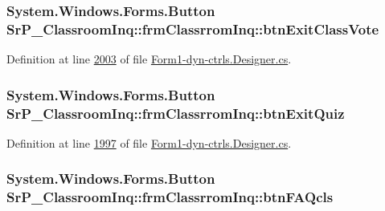 \hypertarget{class_sr_p___classroom_inq_1_1frm_classrrom_inq_a86eaeeecc049840138ceb3aa2d9bf9ef}{
\subsubsection[{btn\-Exit\-Class\-Vote}]{\setlength{\rightskip}{0pt plus 5cm}\-System.\-Windows.\-Forms.\-Button {\bf \-Sr\-P\-\_\-\-Classroom\-Inq\-::frm\-Classrrom\-Inq\-::btn\-Exit\-Class\-Vote}}}
\label{class_sr_p___classroom_inq_1_1frm_classrrom_inq_a86eaeeecc049840138ceb3aa2d9bf9ef}


\-Definition at line \hyperlink{_form1-dyn-ctrls_8_designer_8cs_source_l02003}{2003} of file \hyperlink{_form1-dyn-ctrls_8_designer_8cs_source}{\-Form1-\/dyn-\/ctrls.\-Designer.\-cs}.

\hypertarget{class_sr_p___classroom_inq_1_1frm_classrrom_inq_a207f1be65a3e42071f8375603e4b854c}{
\subsubsection[{btn\-Exit\-Quiz}]{\setlength{\rightskip}{0pt plus 5cm}\-System.\-Windows.\-Forms.\-Button {\bf \-Sr\-P\-\_\-\-Classroom\-Inq\-::frm\-Classrrom\-Inq\-::btn\-Exit\-Quiz}}}
\label{class_sr_p___classroom_inq_1_1frm_classrrom_inq_a207f1be65a3e42071f8375603e4b854c}


\-Definition at line \hyperlink{_form1-dyn-ctrls_8_designer_8cs_source_l01997}{1997} of file \hyperlink{_form1-dyn-ctrls_8_designer_8cs_source}{\-Form1-\/dyn-\/ctrls.\-Designer.\-cs}.

\hypertarget{class_sr_p___classroom_inq_1_1frm_classrrom_inq_a1c53d39fe22e25d8c00aa7d8c97eb9a8}{
\subsubsection[{btn\-F\-A\-Qcls}]{\setlength{\rightskip}{0pt plus 5cm}\-System.\-Windows.\-Forms.\-Button {\bf \-Sr\-P\-\_\-\-Classroom\-Inq\-::frm\-Classrrom\-Inq\-::btn\-F\-A\-Qcls}}}
\label{class_sr_p___classroom_inq_1_1frm_classrrom_inq_a1c53d39fe22e25d8c00aa7d8c97eb9a8}


